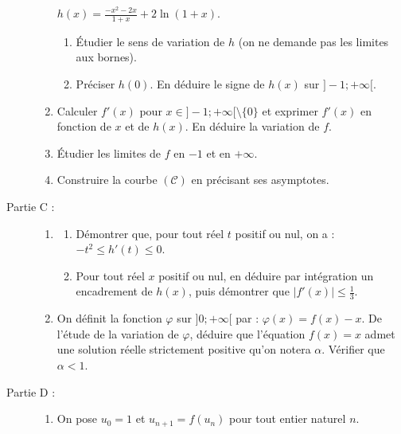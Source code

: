 \begin{exo}
\begin{description}
\begin{enumerate}
                              $h(x) = \frac{-x^2-2x}{1+x}+2\ln(1+x)$.
                              \begin{enumerate}
                                    \item \'Etudier le sens de variation de $h$ (on ne demande pas les limites aux bornes).
                                    \item Pr\'eciser $h(0)$. En d\'eduire le signe de $h(x)$ sur $]-1 ; +\infty[$.
                              \end{enumerate}
                        \item Calculer $f'(x)$ pour $x \in ]-1 ; +\infty[ \setminus \{0\}$ et exprimer $f'(x)$ en fonction de $x$ et de $h(x)$.
                              En d\'eduire la variation de $f$.
                        \item \'Etudier les limites de $f$ en $-1$ et en $+\infty$.
                        \item Construire la courbe $(\mathscr{C})$ en pr\'ecisant ses asymptotes.
                  \end{enumerate}
            \item[Partie C :]
                  \begin{enumerate}
                        \item \begin{enumerate}
                                    \item D\'emontrer que, pour tout r\'eel $t$ positif ou nul, on a : $-t^2 \leq h'(t) \leq 0$.
                                    \item Pour tout r\'eel $x$ positif ou nul, 
                                    en d\'eduire par int\'egration un encadrement de $h(x)$, puis d\'emontrer que $|f'(x)| \leq \frac{1}{3}$.
                              \end{enumerate}
                        \item On d\'efinit la fonction $\varphi$ sur $]0 ; +\infty[$ par : $\varphi (x) = f(x) - x$.
                              De l'\'etude de la variation de $\varphi$, d\'eduire que l'\'equation $f(x) = x$ admet une solution r\'eelle strictement positive qu'on notera $\alpha$.
                              V\'erifier que $\alpha < 1$.
                  \end{enumerate}
            \item[Partie D :]
                  \begin{enumerate}
                        \item On pose $u_0 = 1$ et $u_{n+1} = f(u_n)$ pour tout entier naturel $n$.

\end{enumerate}
\end{description}
\end{exo}
